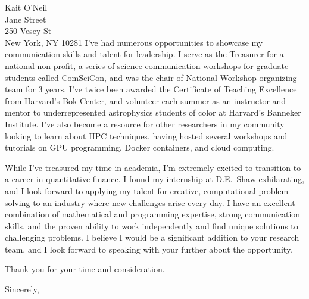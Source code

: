\documentclass{letter}
\begin{document}
\begin{letter}{Kait O'Neil\\
    Jane Street\\ 250 Vesey St\\ New York, NY 10281 }
\noindent I've had numerous opportunities to showcase my communication skills
and talent for leadership. I serve as the Treasurer for a national
non-profit, a series of science communication workshops for graduate students
called ComSciCon, and was the chair of National Workshop organizing team for 3
years. I've twice been awarded the Certificate of Teaching Excellence from
Harvard's Bok Center, and volunteer each summer as an instructor and mentor to
underrepresented astrophysics students of color at Harvard's Banneker
Institute. I've also become a resource for other researchers in my community
looking to learn about HPC techniques, having hosted several workshops and
tutorials on GPU programming, Docker containers, and cloud computing.

\noindent While I've treasured my time in academia, I'm extremely excited to
transition to a career in quantitative finance. I found my internship at
D.E.~Shaw exhilarating, and I look forward to applying my talent for creative,
computational problem solving to an industry where new challenges arise every
day. I have an excellent combination of mathematical and programming
expertise, strong communication skills, and the proven ability to work
independently and find unique solutions to challenging problems. I believe I
would be a significant addition to your research team, and I look forward to
speaking with your further about the opportunity.

Thank you for your time and consideration.

\closing{Sincerely,}

\end{letter}
\end{document}

